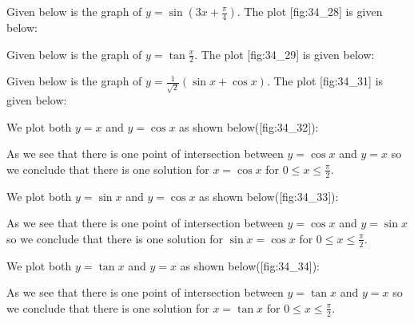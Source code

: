\item Given below is the graph of $y = \sin \left(3x + \frac{\pi}{4}\right)$.  The plot [fig:34_28] is given below:

  \startplacefigure[title={Plot of $\sin\left(3x + \frac{\pi}{4}\right)$}, reference=fig:34_28]
    \externalfigure[34_28.pdf]
  \stopplacefigure

\item Given below is the graph of $y = \tan\frac{x}{2}$. The plot [fig:34_29] is given below:

  \startplacefigure[title={Plot of $\tan\frac{x}{2}$}, reference=fig:34_29]
    \externalfigure[34_29.pdf]
  \stopplacefigure

\item Given below is the graph of $y = \frac{1}{\sqrt{2}}(\sin x + \cos x)$.  The plot [fig:34_31] is given below:

  \startplacefigure[title={Plot of $\frac{1}{\sqrt{2}}(\sin x + \cos x)$}, reference=fig:34_31]
    \externalfigure[34_31.pdf]
  \stopplacefigure

\item  We plot both $y = x$ and $y = \cos x$ as shown below([fig:34_32]):

  \startplacefigure[title={Plot of $\cos x$ and $x$}, reference=fig:34_32]
    \externalfigure[34_32.pdf]
  \stopplacefigure
  As we see that there is one point of intersection between $y = \cos x$ and $y = x$ so we
  conclude that there is one solution for $x = \cos x$ for $0\leq x\leq\frac{\pi}{2}$.

\item We plot both $y = \sin x$ and $y = \cos x$ as shown below([fig:34_33]):

  \startplacefigure[title={Plot of $\cos x$ and $\sin x$}, reference=fig:34_33]
    \externalfigure[34_33.pdf]
  \stopplacefigure

  As we see that there is one point of intersection between $y = \cos x$ and $y = \sin x$ so we
  conclude that there is one solution for $\sin x = \cos x$ for $0\leq x\leq\frac{\pi}{2}$.

\item  We plot both $y = \tan x$ and $y = x$ as shown below([fig:34_34]):

  \startplacefigure[title={Plot of $\tan x$ and $x$}, reference=fig:34_34]
    \externalfigure[34_34.pdf]
  \stopplacefigure

  As we see that there is one point of intersection between $y = \tan x$ and $y = x$ so we
  conclude that there is one solution for $x = \tan x$ for $0\leq x\leq\frac{\pi}{2}$.

